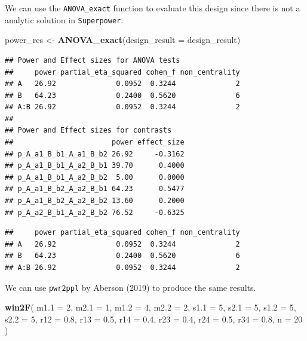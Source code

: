 \documentclass[]{book}
\newenvironment{Shaded}{\begin{snugshade}}{\end{snugshade}}
\newcommand{\DataTypeTok}[1]{\textcolor[rgb]{0.13,0.29,0.53}{#1}}
\newcommand{\DecValTok}[1]{\textcolor[rgb]{0.00,0.00,0.81}{#1}}
\newcommand{\FloatTok}[1]{\textcolor[rgb]{0.00,0.00,0.81}{#1}}
\newcommand{\KeywordTok}[1]{\textcolor[rgb]{0.13,0.29,0.53}{\textbf{#1}}}
\newcommand{\NormalTok}[1]{#1}
\newcommand{\StringTok}[1]{\textcolor[rgb]{0.31,0.60,0.02}{#1}}
\begin{document}
We can use the \texttt{ANOVA\_exact} function to evaluate this design since there is not a analytic solution in \texttt{Superpower}.

\begin{Shaded}
\begin{Highlighting}[]
\NormalTok{power_res <-}\StringTok{ }\KeywordTok{ANOVA_exact}\NormalTok{(}\DataTypeTok{design_result =}\NormalTok{ design_result)}
\end{Highlighting}
\end{Shaded}

\begin{verbatim}
## Power and Effect sizes for ANOVA tests
##     power partial_eta_squared cohen_f non_centrality
## A   26.92              0.0952  0.3244              2
## B   64.23              0.2400  0.5620              6
## A:B 26.92              0.0952  0.3244              2
## 
## Power and Effect sizes for contrasts
##                       power effect_size
## p_A_a1_B_b1_A_a1_B_b2 26.92     -0.3162
## p_A_a1_B_b1_A_a2_B_b1 39.70      0.4000
## p_A_a1_B_b1_A_a2_B_b2  5.00      0.0000
## p_A_a1_B_b2_A_a2_B_b1 64.23      0.5477
## p_A_a1_B_b2_A_a2_B_b2 13.60      0.2000
## p_A_a2_B_b1_A_a2_B_b2 76.52     -0.6325
\end{verbatim}

\begin{verbatim}
##     power partial_eta_squared cohen_f non_centrality
## A   26.92              0.0952  0.3244              2
## B   64.23              0.2400  0.5620              6
## A:B 26.92              0.0952  0.3244              2
\end{verbatim}

We can use \texttt{pwr2ppl} by Aberson (2019) to produce the same results.

\begin{Shaded}
\begin{Highlighting}[]
\KeywordTok{win2F}\NormalTok{(}
  \DataTypeTok{m1.1 =} \DecValTok{2}\NormalTok{,}
  \DataTypeTok{m2.1 =} \DecValTok{1}\NormalTok{,}
  \DataTypeTok{m1.2 =} \DecValTok{4}\NormalTok{,}
  \DataTypeTok{m2.2 =} \DecValTok{2}\NormalTok{,}
  \DataTypeTok{s1.1 =} \DecValTok{5}\NormalTok{,}
  \DataTypeTok{s2.1 =} \DecValTok{5}\NormalTok{,}
  \DataTypeTok{s1.2 =} \DecValTok{5}\NormalTok{,}
  \DataTypeTok{s2.2 =} \DecValTok{5}\NormalTok{,}
  \DataTypeTok{r12 =} \FloatTok{0.8}\NormalTok{,}
  \DataTypeTok{r13 =} \FloatTok{0.5}\NormalTok{,}
  \DataTypeTok{r14 =} \FloatTok{0.4}\NormalTok{,}
  \DataTypeTok{r23 =} \FloatTok{0.4}\NormalTok{,}
  \DataTypeTok{r24 =} \FloatTok{0.5}\NormalTok{,}
  \DataTypeTok{r34 =} \FloatTok{0.8}\NormalTok{,}
  \DataTypeTok{n =} \DecValTok{20}
\NormalTok{)}
\end{Highlighting}
\end{Shaded}
\end{document}
